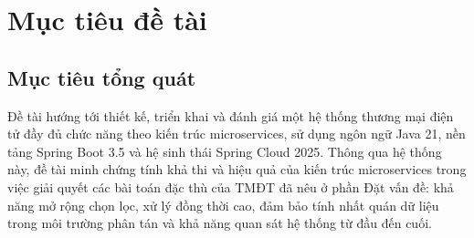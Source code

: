 \documentclass[../DoAn.tex]{subfiles}
\begin{document}




\section{Mục tiêu đề tài}
\label{section:1.2}

\subsection*{Mục tiêu tổng quát}

Đề tài hướng tới thiết kế, triển khai và đánh giá một hệ thống thương mại điện tử đầy đủ chức
năng theo kiến trúc microservices, sử dụng ngôn ngữ Java 21, nền tảng Spring Boot 3.5 và hệ
sinh thái Spring Cloud 2025. Thông qua hệ thống này, đề tài minh chứng tính khả thi và hiệu
quả của kiến trúc microservices trong việc giải quyết các bài toán đặc thù của TMĐT đã nêu ở
phần Đặt vấn đề: khả năng mở rộng chọn lọc, xử lý đồng thời cao, đảm bảo tính nhất quán dữ
liệu trong môi trường phân tán và khả năng quan sát hệ thống từ đầu đến cuối.
\end{document}
